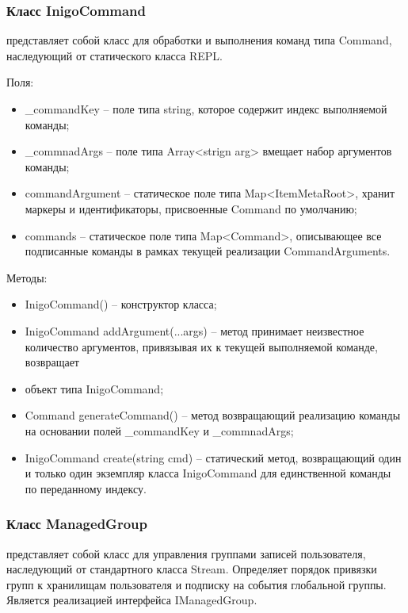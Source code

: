 \subsubsection{Класс InigoCommand }
\label{sub:arch_and_mod:probab_net:inigoCommand}

представляет собой класс для обработки и выполнения команд типа Command, наследующий от статического класса REPL.

Поля:
\begin{itemize}
  \item \_commandKey – поле типа string, которое содержит индекс выполняемой команды;
  \item \_commnadArgs – поле типа Array<strign arg> вмещает набор аргументов команды;
  \item commandArgument – статическое поле типа Map<ItemMetaRoot>, хранит маркеры и идентификаторы, присвоенные Command по умолчанию;
  \item commands – статическое поле типа Map<Command>, описывающее все подписанные команды в рамках текущей реализации CommandArguments.
\end{itemize}

Методы:
\begin{itemize}
  \item InigoCommand() – конструктор класса;
  \item InigoCommand addArgument(...args) – метод принимает неизвестное количество аргументов, привязывая их к текущей выполняемой команде, возвращает
  \item объект типа InigoCommand;
  \item Command generateCommand() – метод возвращающий реализацию команды на основании полей \_commandKey и \_commnadArgs;
  \item InigoCommand create(string cmd) – статический метод, возвращающий один и только один экземпляр класса InigoCommand для единственной команды по переданному индексу.
\end{itemize}

\subsubsection{Класс ManagedGroup }
\label{sub:arch_and_mod:probab_net:managedgroup}

представляет собой класс для управления группами записей пользователя, наследующий от стандартного класса Stream. Определяет порядок привязки групп к хранилищам пользователя и подписку на события глобальной группы. Является реализацией интерфейса IManagedGroup.

